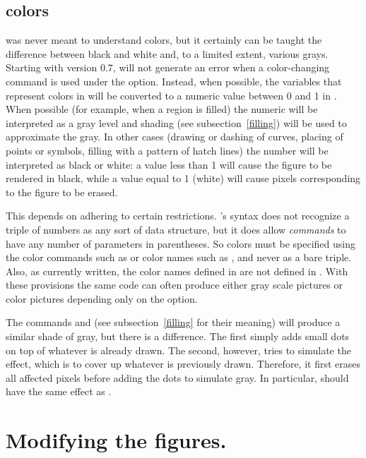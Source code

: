 \documentclass[letterpaper]{article}
\begin{document}
\subsection{\CMF{} colors}\label{MFcolor}

\CMF{} was never meant to understand colors, but it certainly can be
taught the difference between black and white and, to a limited extent,
various grays. Starting with version 0.7, \mfp{} will not generate
an error when a color-changing command is used under the 
option. Instead, when possible, the variables that represent colors in
\MP{} will be converted to a numeric value between 0 and 1 in \MF{}. When
possible (for example, when a region is filled) the numeric will be
interpreted as a gray level and shading (see subsection~\ref{filling})
will be used to approximate the gray. In other cases (drawing or dashing
of curves, placing of points or symbols, filling with a pattern of hatch
lines) the number will be interpreted as black or white: a value less
than 1 will cause the figure to be rendered in black, while a value
equal to 1 (white) will cause pixels corresponding to the figure to be
erased.

This depends on adhering to certain restrictions. \CMF{}'s syntax
does not recognize a triple of numbers as any sort of data structure,
but it does allow \emph{commands} to have any number of parameters in
parentheses. So colors must be specified using the color commands such
as  or color names such as , and never as a
bare triple. Also, as currently written, the color names defined in
 are not defined in \MF{}. With these provisions the
same \mfp{} code can often produce either gray scale \MF{} pictures or
\MP{} color pictures depending only on the  option.

The commands  and  (see
subsection~\ref{filling} for their meaning) will produce a similar shade
of gray, but there is a difference. The first simply adds small dots on
top of whatever is already drawn. The second, however, tries to simulate
the \MP{} effect, which is to cover up whatever is previously drawn.
Therefore, it first erases all affected pixels before adding the dots to
simulate gray. In particular,  should have the
same effect as .


\section{Modifying the figures.}\label{modifier}
\end{document}
